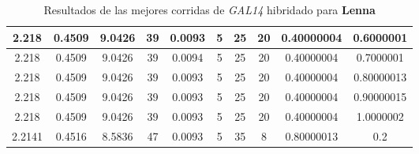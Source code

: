 \begin{table}[h!]
\begin{center}
\begin{tabular}{|c|c|c|c|c|c|c|c|c|c|}
        \hline
        \hline
            2.218 & 0.4509  & 9.0426 & 39 & 0.0093 & 5 & 25 & 20 & 0.40000004 & 0.6000001\\
        \hline
        \hline
            2.218 & 0.4509  & 9.0426 & 39 & 0.0094 & 5 & 25 & 20 & 0.40000004 & 0.7000001\\
        \hline
        \hline
            2.218 & 0.4509  & 9.0426 & 39 & 0.0093 & 5 & 25 & 20 & 0.40000004 & 0.80000013\\
        \hline
        \hline
            2.218 & 0.4509  & 9.0426 & 39 & 0.0093 & 5 & 25 & 20 & 0.40000004 & 0.90000015\\
        \hline
        \hline
            2.218 & 0.4509  & 9.0426 & 39 & 0.0093 & 5 & 25 & 20 & 0.40000004 & 1.0000002\\
        \hline
        \hline
            2.2141 & 0.4516  & 8.5836 & 47 & 0.0093 & 5 & 35 & 8 & 0.80000013 & 0.2\\
        \hline
        \end{tabular}
        \caption{Resultados de las mejores corridas de \emph{GAL14} hibridado para {\bf Lenna}}
        \label{tb:tableGAL14}
    \end{center}
\end{table}
